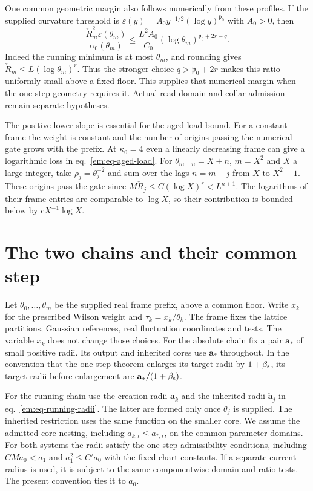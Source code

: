 \documentclass[11pt,letterpaper,reqno]{amsart}
\numberwithin{equation}{section}
\renewcommand{\eqref}[1]{\textup{eq.~\ref{#1}}}
\theoremstyle{definition}
\theoremstyle{remark}
\begin{document}
One common geometric margin also follows numerically from these
profiles. If the supplied curvature threshold is
$\varepsilon(y)=A_0y^{-1/2}(\log y)^{\mathfrak p_0}$ with $A_0>0$,
then
\[
 \frac{\check R_m^2\varepsilon(\theta_m)}{\alpha_0(\theta_m)}
 \le\frac{L^2A_0}{C_0}
                (\log\theta_m)^{\mathfrak p_0+2r-q}.
\]
Indeed the running minimum is at most $\theta_m$, and rounding
gives $\check R_m\le L(\log\theta_m)^r$. Thus the stronger choice
$q>\mathfrak p_0+2r$ makes this ratio uniformly small above a fixed
floor. This supplies that numerical margin when the one-step
geometry requires it. Actual read-domain and collar admission
remain separate hypotheses.

The positive lower slope is essential for the aged-load bound.
For a constant frame the weight is constant and the number of
origins passing the numerical gate grows with the prefix. At
$\kappa_0=4$ even a linearly decreasing frame can give a logarithmic
loss in \eqref{em:eq-aged-load}. For $\theta_{m-n}=X+n$,
$m=X^2$ and $X$ a large integer, take $\rho_j=\theta_j^{-2}$ and
sum over the lags $n=m-j$ from $X$ to $X^2-1$. These origins pass
the gate since $M\check R_j\le C(\log X)^r<L^{n+1}$. The logarithms
of their frame entries are comparable to $\log X$, so their
contribution is bounded below by $cX^{-1}\log X$.


\section{The two chains and their common step}


Let $\theta_0,\ldots,\theta_m$ be the supplied real frame prefix, above a
common floor. Write $x_k$ for the prescribed Wilson weight and
$\tau_k=x_k/\theta_k$. The frame fixes the lattice partitions, Gaussian
references, real fluctuation coordinates and tests. The variable $x_k$
does not change those choices. For the absolute chain fix a pair
$\mathbf a_*$ of small positive radii. Its output and inherited cores
use $\mathbf a_*$ throughout. In the convention that the one-step
theorem enlarges its target radii by $1+\beta_{\rm s}$, its target radii before
enlargement are $\mathbf a_* /(1+\beta_{\rm s})$.

For the running chain use the creation radii $\bar{\mathbf a}_k$
and the inherited radii $\check{\mathbf a}_j$ in
\eqref{em:eq-running-radii}. The latter are
formed only once $\theta_j$ is supplied. The inherited restriction uses
the same function on the smaller core. We assume the admitted core nesting,
including $\bar a_{k,\iota}\le a_{*,\iota}$, on the common parameter
domains. For both systems the radii satisfy the one-step admissibility
conditions, including $CMa_0<a_1$ and $a_1^2\le C'a_0$ with the fixed
chart constants. If a separate current radius is used, it is subject to
the same componentwise domain and ratio tests. The present convention
ties it to $a_0$.
\end{document}
